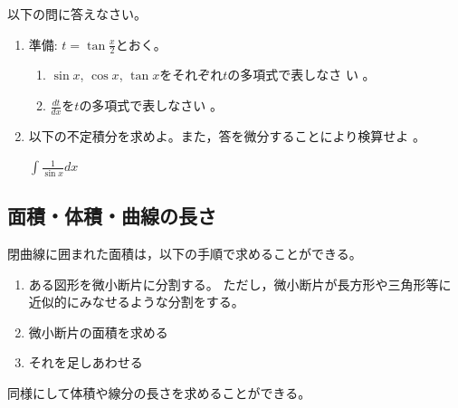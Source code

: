 \documentclass[twocolumn,11pt]{jarticle}
\begin{document}
\exercise
以下の問に答えなさい。
\begin{enumerate}
\item 準備: $\displaystyle t=\tan\frac{x}{2}$とおく。
  \begin{enumerate}
  \item $\sin x$,  $\cos x$,  $\tan x$をそれぞれ$t$の多項式で表しなさ
    い
    。
  \item $\displaystyle\frac{dt}{dx}$を$t$の多項式で表しなさい
    。
  \end{enumerate}
\item 以下の不定積分を求めよ。また，答を微分することにより検算せよ
。

$\displaystyle\int \frac{1}{\sin x}dx$
\end{enumerate}


\subsection{面積・体積・曲線の長さ}
閉曲線に囲まれた面積は，以下の手順で求めることができる。
\begin{enumerate}
\item ある図形を微小断片に分割する。
  ただし，微小断片が長方形や三角形等に近似的にみなせるような分割をする。
\item 微小断片の面積を求める
\item それを足しあわせる
\end{enumerate}
同様にして体積や線分の長さを求めることができる。
\end{document}
